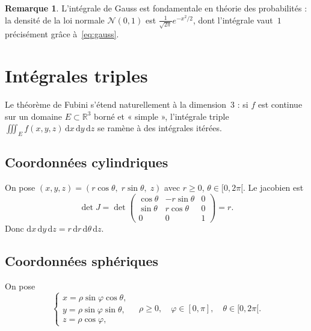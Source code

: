 \documentclass[12pt,a4paper,openany]{book}
\theoremstyle{definition}
\newtheorem{remarque}{Remarque}[chapter]
\newcommand{\R}{\mathbb{R}}
\newcommand{\dd}{\mathrm{d}}
\begin{document}
\begin{remarque}\label{rem:gauss-probabilites}
  L'intégrale de Gauss est fondamentale en théorie des probabilités : la
  densité de la loi normale $\mathcal{N}(0,1)$ est
  $\frac{1}{\sqrt{2\pi}}e^{-x^2/2}$, dont l'intégrale vaut~$1$
  précisément grâce à~\eqref{eq:gauss}.
\end{remarque}



\section{Intégrales triples}
\label{sec:integrales-triples}


Le théorème de Fubini s'étend naturellement
à la dimension~3 : si $f$ est continue sur un domaine $E \subset \R^3$
borné et « simple », l'intégrale triple
$\iiint_E f(x,y,z)\,\dd x\,\dd y\,\dd z$ se ramène à des intégrales
itérées.

\subsection{Coordonnées cylindriques}
\label{subsec:coord-cylindriques}


On pose $(x,y,z) = (r\cos\theta,\; r\sin\theta,\; z)$ avec $r \geqslant 0$,
$\theta \in [0, 2\pi[$. Le jacobien est
\[
  \det J = \det\begin{pmatrix}
    \cos\theta & -r\sin\theta & 0 \\
    \sin\theta & r\cos\theta  & 0 \\
    0          & 0            & 1
  \end{pmatrix} = r.
\]
Donc $\dd x\,\dd y\,\dd z = r\,\dd r\,\dd\theta\,\dd z$.

\subsection{Coordonnées sphériques}
\label{subsec:coord-spheriques}


On pose
\[
  \begin{cases}
    x = \rho\sin\varphi\cos\theta, \\
    y = \rho\sin\varphi\sin\theta, \\
    z = \rho\cos\varphi,
  \end{cases}
  \quad \rho \geqslant 0,\quad \varphi \in [0,\pi],\quad
  \theta \in [0, 2\pi[.
\]
\end{document}
